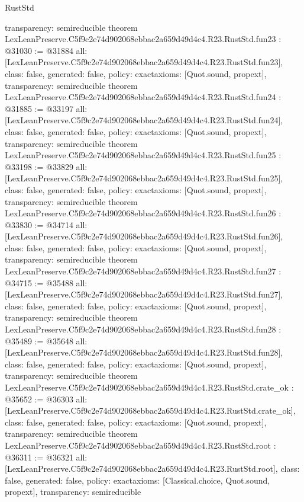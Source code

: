 \begin{lexlean}{RustStd}
\begin{coremodule}
{  transparency: semireducible
}
theorem LexLeanPreserve.C5f9c2e74d902068ebbac2a659d49d4c4.R23.RustStd.fun23 : @31030 := @31884 {
  all: [LexLeanPreserve.C5f9c2e74d902068ebbac2a659d49d4c4.R23.RustStd.fun23],
  class: false,
  generated: false,
  policy: exact{axioms: [Quot.sound, propext]},
  transparency: semireducible
}
theorem LexLeanPreserve.C5f9c2e74d902068ebbac2a659d49d4c4.R23.RustStd.fun24 : @31885 := @33197 {
  all: [LexLeanPreserve.C5f9c2e74d902068ebbac2a659d49d4c4.R23.RustStd.fun24],
  class: false,
  generated: false,
  policy: exact{axioms: [Quot.sound, propext]},
  transparency: semireducible
}
theorem LexLeanPreserve.C5f9c2e74d902068ebbac2a659d49d4c4.R23.RustStd.fun25 : @33198 := @33829 {
  all: [LexLeanPreserve.C5f9c2e74d902068ebbac2a659d49d4c4.R23.RustStd.fun25],
  class: false,
  generated: false,
  policy: exact{axioms: [Quot.sound, propext]},
  transparency: semireducible
}
theorem LexLeanPreserve.C5f9c2e74d902068ebbac2a659d49d4c4.R23.RustStd.fun26 : @33830 := @34714 {
  all: [LexLeanPreserve.C5f9c2e74d902068ebbac2a659d49d4c4.R23.RustStd.fun26],
  class: false,
  generated: false,
  policy: exact{axioms: [Quot.sound, propext]},
  transparency: semireducible
}
theorem LexLeanPreserve.C5f9c2e74d902068ebbac2a659d49d4c4.R23.RustStd.fun27 : @34715 := @35488 {
  all: [LexLeanPreserve.C5f9c2e74d902068ebbac2a659d49d4c4.R23.RustStd.fun27],
  class: false,
  generated: false,
  policy: exact{axioms: [Quot.sound, propext]},
  transparency: semireducible
}
theorem LexLeanPreserve.C5f9c2e74d902068ebbac2a659d49d4c4.R23.RustStd.fun28 : @35489 := @35648 {
  all: [LexLeanPreserve.C5f9c2e74d902068ebbac2a659d49d4c4.R23.RustStd.fun28],
  class: false,
  generated: false,
  policy: exact{axioms: [Quot.sound, propext]},
  transparency: semireducible
}
theorem LexLeanPreserve.C5f9c2e74d902068ebbac2a659d49d4c4.R23.RustStd.crate_ok : @35652 := @36303 {
  all: [LexLeanPreserve.C5f9c2e74d902068ebbac2a659d49d4c4.R23.RustStd.crate_ok],
  class: false,
  generated: false,
  policy: exact{axioms: [Quot.sound, propext]},
  transparency: semireducible
}
theorem LexLeanPreserve.C5f9c2e74d902068ebbac2a659d49d4c4.R23.RustStd.root : @36311 := @36321 {
  all: [LexLeanPreserve.C5f9c2e74d902068ebbac2a659d49d4c4.R23.RustStd.root],
  class: false,
  generated: false,
  policy: exact{axioms: [Classical.choice, Quot.sound, propext]},
  transparency: semireducible
}


\end{coremodule}
\end{lexlean}

